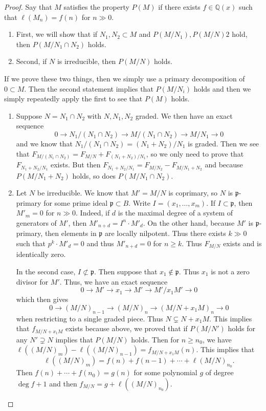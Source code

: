 \documentclass[leqno, openany]{memoir}
\theoremstyle{definition}
\theoremstyle{remark}
\theoremstyle{plain}
\theoremstyle{definition}
\theoremstyle{remark}
\newcommand{\Q}{\mathbb{Q}}
\newcommand{\mf}[1]{\mathfrak{#1}}
\begin{document}
\begin{proof} Say that $M$ satisfies the property $P(M)$ if there exists $f \in
    \Q(x)$ such that $\ell(M_n) = f(n)$ for $n \gg 0$.  \begin{enumerate} \item
        First, we will show that if $N_1, N_2 \subset M$ and $P(M/N_1),
        P(M/N)2$ hold, then $P(M/N_1 \cap N_2)$ holds.  \item Second, if $N$ is
irreducible, then $P(M/N)$ holds.  \end{enumerate} If we prove these two
things, then we simply use a primary decomposition of $0 \subset M$. Then the
second statement implies that $P(M/N_i)$ holds and then we simply repeatedly
apply the first to see that $P(M)$ holds.  \begin{enumerate} \item Suppose $N =
    N_1 \cap N_2$ with $N, N_1, N_2$ graded. We then have an exact sequence \[
    0 \to N_1 / (N_1 \cap N_2) \to M / (N_1 \cap N_2) \to M/N_1 \to 0 \] and we
    know that $N_1 / (N_1 \cap N_2) = (N_1 + N_2) / N_1$ is graded. Then we see
    that $F_{M/(N_1 \cap N_2)} = F_{M/N} + F_{(N_1 + N_2)/N_1}$, so we only
    need to prove that $F_{N_1 + N_2 / N_1}$ exists. But then $F_{N_1 + N_2 /
    N_1} = F_{M / N_2} - F_{M/N_1 + N_2}$ and because $P(M/N_1 + N_2)$ holds,
    so does $P(M/N_1 \cap N_2)$.  \item Let $N$ be irreducible. We know that
    $M' = M/N$ is coprimary, so $N$ is $\mf{p}$-primary for some prime ideal
    $\mf{p} \subset B$. Write $I = (x_1, \ldots, x_m)$. If $I \subset \mf{p}$,
    then $M'_m = 0$ for $n \gg 0$. Indeed, if $d$ is the maximal degree of a
    system of generators of $M'$, then $M'_{n+d} = I^n \cdot M'_d$. On the
    other hand, because $M'$ is $\mf{p}$-primary, then elements in $\mf{p}$ are
    locally nilpotent. Thus there exists $k \gg 0$ such that $p^k \cdot M'_d =
    0$ and thus $M'_{n+d} = 0$ for $n \geq k$. Thus $F_{M/N}$ exists and is
    identically zero.

            In the second case, $I \not\subset \mf{p}$. Then suppose that $x_1
            \notin \mf{p}$. Thus $x_1$ is not a zero divisor for $M'$. Thus, we
            have an exact sequence \[ 0 \to M' \to x_1 \to M' \to M'/x_1M' \to
                0 \] which then gives \[ 0 \to (M/N)_{n-1} \to (M/N)_n \to
            (M/N+x_1 M)_n \to 0 \] when restricting to a single graded piece.
            Thus $N \subsetneq N + x_1 M$. This implies that $f_{M/N + x_1 M}$
            exists because above, we proved that if $P(M/N')$ holds for any $N'
            \supsetneq N$ implies that $P(M/N)$ holds. Then for $n \geq n_0$,
            we have $\ell((M/N)_m) - \ell((M/N)_{n-1}) = f_{M/N + x_1 M}(n)$.
            This implies that \[ \ell((M/N)_m) = f(n) + f(n-1) + \cdots +
        \ell(M/N)_{n_0}. \] Then $f(n) + \cdots + f(n_0) = g(n)$ for some
polynomial $g$ of degree $\deg f + 1$ and then $f_{M/N} = g +
\ell((M/N)_{n_0})$.\qedhere \end{enumerate} \end{proof}
\end{document}
